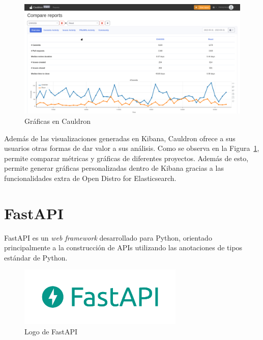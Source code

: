 \begin{figure}[ht]
    \centering
    \includegraphics[width=\textwidth]{Figures/cauldron-charts}
    \decoRule
    \caption[Cauldron (Gráficas)]{Gráficas en Cauldron \emph{\parencite{Reference13}}}
    \label{fig:cauldron-charts}
\end{figure}

Además de las visualizaciones generadas en Kibana, Cauldron ofrece a sus usuarios otras formas de dar valor a sus análisis. Como se observa en la Figura~\ref{fig:cauldron-charts}, permite comparar métricas y gráficas de diferentes proyectos. Además de esto, permite generar gráficas personalizadas dentro de Kibana gracias a las funcionalidades extra de Open Distro for Elasticsearch.


\section{FastAPI}

FastAPI es un \emph{web framework} desarrollado para Python, orientado principalmente a la construcción de APIs utilizando las anotaciones de tipos estándar de Python. \emph{\parencite{Reference14}}

\begin{figure}[ht]
    \centering
    \includegraphics[width=0.7\textwidth]{Figures/fastapi-logo}
    \decoRule
    \caption[FastAPI (Logo)]{Logo de FastAPI \emph{\parencite{Reference14}}}
    \label{fig:fastapi-logo}
\end{figure}

